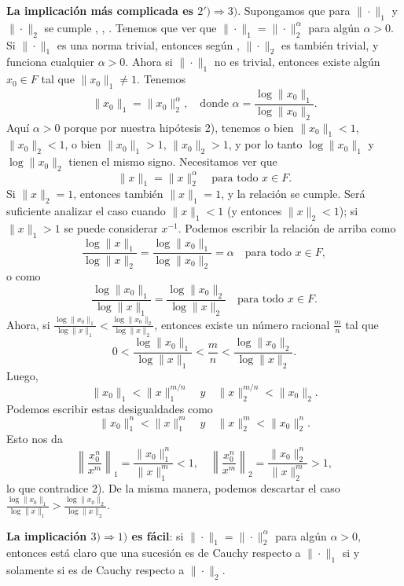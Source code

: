 \documentclass{article}
\numberwithin{equation}{section}
\theoremstyle{definition}
\begin{document}
\noindent\textbf{La implicación más complicada es
  $2') \Rightarrow 3)$}. Supongamos que para $\|\cdot\|_1$ y $\|\cdot\|_2$
se cumple ,
,
. Tenemos que ver que
$\|\cdot\|_1 = \|\cdot\|_2^\alpha$ para algún $\alpha > 0$. Si $\|\cdot\|_1$
es una norma trivial, entonces según ,
$\|\cdot\|_2$ es también trivial, y funciona cualquier $\alpha > 0$.
Ahora si $\|\cdot\|_1$ no es trivial, entonces existe algún $x_0\in F$ tal que
$\|x_0\|_1 \ne 1$. Tenemos
\[ \|x_0\|_1 = \|x_0\|_2^\alpha,
   \quad \text{donde } \alpha = \frac{\log \|x_0\|_1}{\log \|x_0\|_2}. \]
Aquí $\alpha > 0$ porque por nuestra hipótesis 2), tenemos o bien
$\|x_0\|_1 < 1$, $\|x_0\|_2 < 1$, o bien $\|x_0\|_1 > 1$, $\|x_0\|_2 > 1$, y por
lo tanto $\log \|x_0\|_1$ y $\log \|x_0\|_2$ tienen el mismo signo. Necesitamos
ver que
$$\|x\|_1 = \|x\|_2^\alpha \quad \text{para todo }x\in F.$$
Si $\|x\|_2 = 1$, entonces también $\|x\|_1 = 1$, y la relación se cumple.
Será suficiente analizar el caso cuando $\|x\|_1 < 1$ (y entonces
$\|x\|_2 < 1$); si $\|x\|_1 > 1$ se puede considerar $x^{-1}$. Podemos escribir
la relación de arriba como
\[ \frac{\log \|x\|_1}{\log \|x\|_2} =
   \frac{\log \|x_0\|_1}{\log \|x_0\|_2} = \alpha
   \quad \text{para todo }x\in F, \]
o como
\[ \frac{\log \|x_0\|_1}{\log \|x\|_1} =
   \frac{\log \|x_0\|_2}{\log \|x\|_2}
   \quad \text{para todo }x\in F. \]
Ahora, si
$\frac{\log \|x_0\|_1}{\log \|x\|_1} < \frac{\log \|x_0\|_2}{\log \|x\|_2}$,
entonces existe un número racional $\frac{m}{n}$ tal que
\[ 0 < \frac{\log\|x_0\|_1}{\log\|x\|_1} <
  \frac{m}{n} <
  \frac{\log\|x_0\|_2}{\log\|x\|_2}. \]
Luego,
$$\|x_0\|_1 < \|x\|_1^{m/n} \quad y \quad \|x\|_2^{m/n} < \|x_0\|_2.$$
Podemos escribir estas desigualdades como
$$\|x_0\|_1^n < \|x\|_1^m \quad y \quad \|x\|_2^m < \|x_0\|_2^n.$$
Esto nos da
\[ \left\|\frac{x_0^n}{x^m}\right\|_1 = \frac{\|x_0\|_1^n}{\|x\|_1^m} < 1, \quad
   \left\|\frac{x_0^n}{x^m}\right\|_2 = \frac{\|x_0\|_2^n}{\|x\|_2^m} > 1, \]
lo que contradice 2). De la misma manera, podemos descartar el caso
$\frac{\log \|x_0\|_1}{\log \|x\|_1} > \frac{\log \|x_0\|_2}{\log \|x\|_2}$.

\vspace{1em}

\noindent\textbf{La implicación $3) \Rightarrow 1)$ es fácil}:
si $\|\cdot\|_1 = \|\cdot\|_2^\alpha$ para algún $\alpha > 0$, entonces está
claro que una sucesión es de Cauchy respecto a $\|\cdot\|_1$ si y solamente si
es de Cauchy respecto a $\|\cdot\|_2$.
\end{document}
